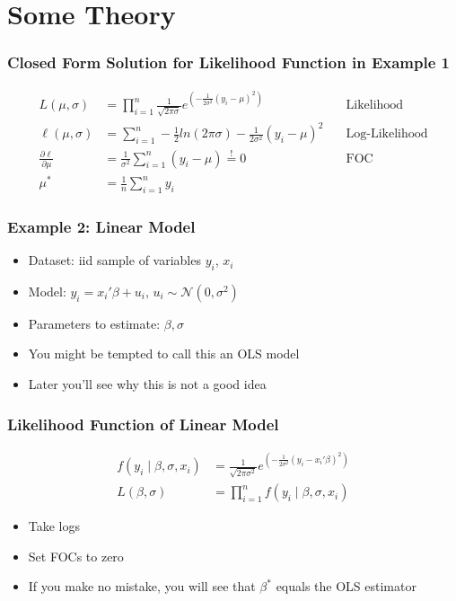 \documentclass[11pt]{beamer}
\begin{document}
\section{Some Theory}


\begin{frame}[c]\frametitle{Closed Form Solution for Likelihood Function in Example 1}
    \begin{align*}
        L(\mu, \sigma) &= \prod_{i = 1}^n \frac{1}{\sqrt{2 \pi \sigma}} e^{\left(-\frac{1}{2 \sigma^2}(y_i - \mu)^2\right)} & \quad \text{Likelihood}\\
        \ell (\mu, \sigma) &= \sum_{i = 1}^n - \frac{1}{2}ln(2\pi\sigma) - \frac{1}{2 \sigma^2}(y_i - \mu)^2 & \quad \text{Log-Likelihood} \\
        \frac{\partial \ell}{\partial \mu} &= \frac{1}{\sigma^2} \sum_{i = 1}^n (y_i - \mu) \stackrel{!}{=} 0 & \quad \text{FOC} \\
        \mu^{*} &= \frac{1}{n} \sum_{i = 1}^n y_i
    \end{align*}
\end{frame}


\begin{frame}[c]\frametitle{Example 2: Linear Model}
    \begin{itemize}
        \item Dataset: iid sample of variables $y_i$, $x_i$
        \item Model: $y_i = x_i'\beta + u_i$, $u_i \sim \mathcal{N}(0, \sigma^2)$
        \item Parameters to estimate: $\beta, \sigma$
        \pause
        \item You might be tempted to call this an OLS model
        \item Later you'll see why this is not a good idea
    \end{itemize}
\end{frame}


\begin{frame}[c]\frametitle{Likelihood Function of Linear Model}
    \begin{align*}
        f(y_i \mid \beta, \sigma, x_i) &= \frac{1}{\sqrt{2\pi\sigma^2}} e^{\left(-\frac{1}{2 \sigma^2}(y_i - x_i' \beta)^2\right)} \\
        L(\beta, \sigma) &= \prod_{i = 1}^n f(y_i \mid \beta, \sigma, x_i)
    \end{align*}

    \vspace{1cm}
    \begin{itemize}
        \item Take logs
        \item Set FOCs to zero
        \item If you make no mistake, you will see that $\beta^{*}$ equals the OLS estimator
    \end{itemize}
\end{frame}
\end{document}
